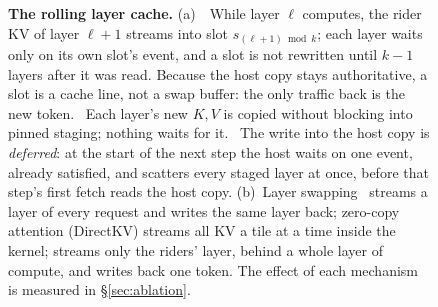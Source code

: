 \begin{figure}[t]
\caption{\textbf{The rolling layer cache.}
(a)~~While layer $\ell$ computes, the rider KV of layer $\ell{+}1$ streams
into slot $s_{(\ell+1)\bmod k}$; each layer waits only on its own slot's event, and
a slot is not rewritten until $k{-}1$ layers after it was read. Because the host
copy stays authoritative, a slot is a cache line, not a swap buffer: the only
traffic back is the new token. ~Each layer's new $K,V$ is copied without
blocking into pinned staging; nothing waits for it. ~The write into the
host copy is \emph{deferred}: at the start of the next step the host waits on one
event, already satisfied, and scatters every staged layer at once, before that
step's first fetch reads the host copy.
(b)~Layer swapping~\cite{pie} streams a layer of every request and writes the same layer back;
zero-copy attention (DirectKV) streams all KV a tile at a time inside the kernel;
\sysname{} streams only the riders' layer, behind a whole layer of compute, and
writes back one token. The effect of each mechanism is measured in
\S\ref{sec:ablation}.}
\label{fig:rolling}
\end{figure}
